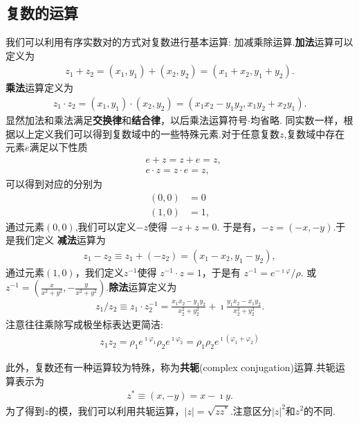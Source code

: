 \subsection{复数的运算}
我们可以利用有序实数对的方式对复数进行基本运算: 加减乘除运算.{\bf 加法}运算可以定义为
\begin{align}
    z_1 + z_2 = (x_1, y_1) + (x_2, y_2) = (x_1 + x_2, y_1 + y_2) .
\end{align}
{\bf 乘法}运算定义为
\begin{align}
    z_1 \cdot z_2 = (x_1, y_1) \cdot (x_2, y_2) = (x_1 x_2 - y_1 y_2, x_1 y_2 + x_2 y_1) .
\end{align}
显然加法和乘法满足{\bf 交换律}和{\bf 结合律}，以后乘法运算符号$\cdot$均省略.
同实数一样，根据以上定义我们可以得到复数域中的一些特殊元素.对于任意复数$z$,复数域中存在元素$e$满足以下性质
\begin{align}
    & e + z = z + e = z ,\\ 
    & e \cdot z = z \cdot e = z , 
\end{align}
可以得到对应的分别为
\begin{align}
    (0, 0) &= 0\\
    (1, 0) &= 1 ,
\end{align}
通过元素$(0,0)$,我们可以定义$-z$使得 $-z + z = 0$. 于是有，$- z = (-x, -y)$.于是我们定义
{\bf 减法}运算为 
\begin{align}
    z_1 - z_2 \equiv z_1 + (-z_2) = (x_1 - x_2, y_1 - y_2) ,
\end{align}
通过元素$(1,0)$，我们定义$z^{-1}$使得
$z^{-1} \cdot z = 1$，于是有 $z^{-1} =e^{-\imath \varphi}/\rho  $.
或$z^{-1} = (\frac{x}{x^2 + y^2}, -\frac{y}{x^2 + y^2})$.{\bf 除法}运算定义为
\begin{align}
    z_1 / z_2 \equiv z_1 \cdot z_2^{-1} = \frac{x_1 x_2 - y_1 y_2} {x_2^2  +  y_2^2 }  + \imath \frac{y_1 x_2 - x_1 y_2} {x_2^2  +  y_2^2 } . 
\end{align}
注意往往乘除写成极坐标表达更简洁:
\begin{align}
    z_1 z_2 = \rho_1 e^{\imath \varphi_1 } \rho_2 e^{\imath \varphi_2 } = \rho_1 \rho_2 e^{\imath (\varphi_1 + \varphi_2)}
\end{align}

此外，复数还有一种运算较为特殊，称为{\bf 共轭}(complex conjugation)运算.共轭运算表示为
\begin{align}
    z^{*} \equiv (x, -y) = x - \imath y .
\end{align}
为了得到$z$的模，我们可以利用共轭运算，$|z| = \sqrt{zz^{*}}$.注意区分$|z|^2$和$z^2$的不同.

